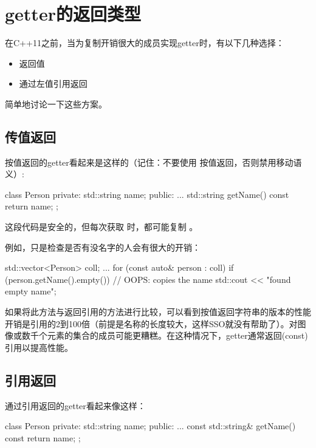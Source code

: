 \section{getter的返回类型}
在C++11之前，当为复制开销很大的成员实现getter时，有以下几种选择：

\begin{itemize}
	\item 返回值
	\item 通过左值引用返回
\end{itemize}

简单地讨论一下这些方案。

\subsection{传值返回}

按值返回的getter看起来是这样的（记住：不要使用  按值返回，否则禁用移动语义）:

\begin{cppcode}
class Person
{
private:
	std::string name;
public:
	...
	std::string getName() const {
		return name;
	}
};
\end{cppcode}

这段代码是安全的，但每次获取  时，都可能复制 。

例如，只是检查是否有没名字的人会有很大的开销：

\begin{cppcode}
std::vector<Person> coll;
...
for (const auto& person : coll) {
	if (person.getName().empty()) { // OOPS: copies the name
		std::cout << "found empty name\n";
	}
}
\end{cppcode}

如果将此方法与返回引用的方法进行比较，可以看到按值返回字符串的版本的性能开销是引用的2到100倍（前提是名称的长度较大，这样SSO就没有帮助了）。对图像或数千个元素的集合的成员可能更糟糕。在这种情况下，getter通常返回(const)引用以提高性能。

\subsection{引用返回}

通过引用返回的getter看起来像这样：

\begin{cppcode}
class Person
{
private:
	std::string name;
public:
	...
	const std::string& getName() const {
		return name;
	}
};
\end{cppcode}


